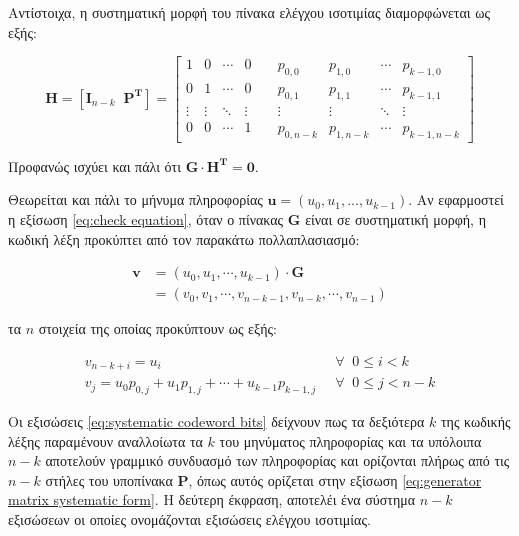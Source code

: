 Αντίστοιχα, η συστηματική μορφή του πίνακα ελέγχου ισοτιμίας διαμορφώνεται ως εξής:

\begin{equation}
\mathbf{H}=\left[\mathbf{I}_{n-k}\;\;\mathbf{P^T}\right]
=\begin{bmatrix}
1 & 0 & \cdots & 0 & \; & p_{0,0} & p_{1,0} & \cdots & p_{k-1,0} \\
0 & 1 & \cdots & 0 & \; & p_{0,1} & p_{1,1} & \cdots & p_{k-1,1} \\
\vdots & \vdots & \ddots & \vdots  & \; & \vdots & \vdots & \ddots & \vdots \\
0 & 0 & \cdots & 1 & \; & p_{0,n-k} & p_{1,n-k} & \cdots & p_{k-1,n-k}
\end{bmatrix}
\label{eq:parity check matrix systematic form}
\end{equation}

\vspace{5mm}
Προφανώς ισχύει και πάλι ότι $\mathbf{G}\cdot\mathbf{H^T}=\mathbf{0}$.

Θεωρείται και πάλι το μήνυμα πληροφορίας $\mathbf{u} = (u_0, u_1, ..., u_{k-1})$. Αν εφαρμοστεί η εξίσωση \ref{eq:check equation}, όταν ο πίνακας $\mathbf{G}$ είναι σε συστηματική μορφή, η κωδική λέξη προκύπτει από τον παρακάτω πολλαπλασιασμό:

\begin{equation}
\begin{split}
\mathbf{v} & = \left( u_0, u_1, \cdots, u_{k-1} \right) \cdot \mathbf{G}\\
& = \left( v_0, v_1, \cdots, v_{n-k-1}, v_{n-k}, \cdots, v_{n-1} \right)
\end{split}
\label{eq:systematic codeword formation}
\end{equation}

\vspace{5mm}

τα $n$ στοιχεία της οποίας προκύπτουν ως εξής:

\begin{equation}
\begin{aligned}
v_{n-k+i}=u_i\;\;\ & \forall\;\;0\leq i < k  \\
v_j=u_0p_{0,j}+u_1p_{1,j}+\cdots+u_{k-1}p_{k-1,j}\;\; & \forall\;\;0\leq j < n-k
\end{aligned}
\label{eq:systematic codeword bits}
\end{equation}

\vspace{5mm}

Οι εξισώσεις \ref{eq:systematic codeword bits} δείχνουν πως τα δεξιότερα $k$  της κωδικής λέξης παραμένουν αναλλοίωτα τα $k$  του μηνύματος πληροφορίας και τα υπόλοιπα $n-k$ αποτελούν γραμμικό συνδυασμό των  πληροφορίας και ορίζονται πλήρως από τις $n-k$ στήλες του υποπίνακα $\mathbf{P}$, όπως αυτός ορίζεται στην εξίσωση \ref{eq:generator matrix systematic form}. Η δεύτερη έκφραση, αποτελέι ένα σύστημα $n-k$ εξισώσεων οι οποίες ονομάζονται εξισώσεις ελέγχου ισοτιμίας.

